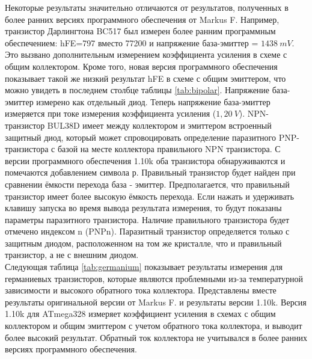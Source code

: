 Некоторые результаты значительно отличаются от результатов, полученных в более ранних версиях программного 
обеспечения от Markus F. Например, транзистор Дарлингтона BC517 был измерен более ранним программным 
обеспечением: hFE=797 вместо 77200 и напряжение база-эмиттер = \(1438~mV\). Это вызвано дополнительным измерением 
коэффициента усиления в схеме с общим коллектором. Кроме того, новая версия программного обеспечения показывает 
такой же низкий результат hFE в схеме с общим эмиттером, что можно увидеть в последнем столбце 
таблицы \ref{tab:bipolar}.
Напряжение база-эмиттер измерено как отдельный диод. Теперь напряжение база-эмиттер измеряется при токе измерения 
коэффициента усиления (\(1,20~V\)). NPN-транзистор BUL38D имеет между коллектором и эмиттером встроенный защитный диод, 
который может спровоцировать определение паразитного PNP-транзистора с базой на месте коллектора правильного 
NPN транзистора. С версии программного обеспечения 1.10k оба транзистора обнаруживаются и помечаются добавлением 
символа р. Правильный транзистор будет найден при сравнении ёмкости перехода база - эмиттер. Предполагается, 
что правильный транзистор имеет более высокую ёмкость перехода. Если нажать и удерживать клавишу запуска во время 
вывода результата измерения, то будут показаны параметры паразитного транзистора. Наличие правильного транзистора 
будет отмечено индексом n (PNPn). Паразитный транзистор определяется только с защитным диодом, расположенном на 
том же кристалле, что и правильный транзистор, а не с внешним диодом.\\

Следующая таблица \ref{tab:germanium} показывает результаты измерения для германиевых транзисторов, которые являются 
проблемными из-за температурной зависимости и высокого обратного тока коллектора. Представлены вместе результаты 
оригинальной версии от Markus F. и результаты версии 1.10k. Версия 1.10k для ATmega328 измеряет коэффициент усиления 
в схемах с общим коллектором и общим эмиттером с учетом обратного тока коллектора, и выводит более высокий результат. 
Обратный ток коллектора не учитывался в более ранних версиях программного обеспечения.

